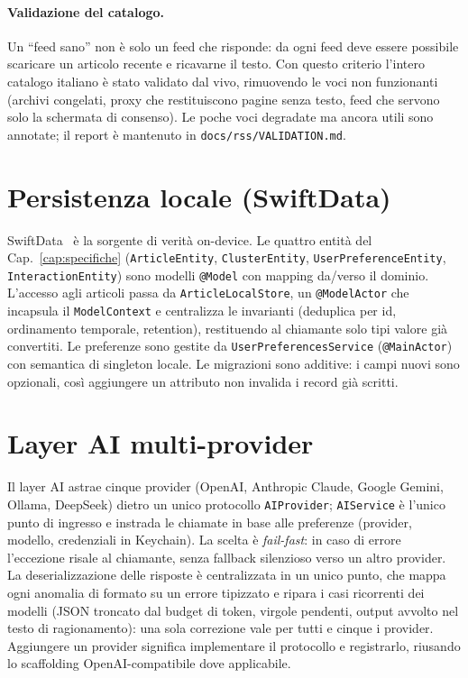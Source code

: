 \paragraph{Validazione del catalogo.}
\label{sec:catalog-validation}
Un ``feed sano'' non è solo un feed che risponde: da ogni feed deve
essere possibile scaricare un articolo recente e ricavarne il
testo. Con questo criterio l'intero catalogo italiano è stato validato
dal vivo, rimuovendo le voci non funzionanti (archivi congelati, proxy
che restituiscono pagine senza testo, feed che servono solo la schermata
di consenso). Le poche voci degradate ma ancora utili sono annotate; il
report è mantenuto in \texttt{docs/rss/VALIDATION.md}.

\section{Persistenza locale (SwiftData)}
SwiftData~\cite{apple-swiftdata} è la sorgente di verità on-device. Le
quattro entità del Cap.~\ref{cap:specifiche} (\texttt{ArticleEntity},
\texttt{ClusterEntity}, \texttt{UserPreferenceEntity},
\texttt{InteractionEntity}) sono modelli \texttt{@Model} con mapping
da/verso il dominio. L'accesso agli articoli passa da
\texttt{ArticleLocalStore}, un \texttt{@ModelActor} che incapsula il
\texttt{ModelContext} e centralizza le invarianti (deduplica per id,
ordinamento temporale, retention), restituendo al chiamante solo tipi
valore già convertiti. Le preferenze sono gestite da
\texttt{UserPreferencesService} (\texttt{@MainActor}) con semantica di
singleton locale. Le migrazioni sono additive: i campi nuovi sono
opzionali, così aggiungere un attributo non invalida i record già
scritti.

\section{Layer AI multi-provider}
Il layer AI astrae cinque provider (OpenAI, Anthropic Claude, Google
Gemini, Ollama, DeepSeek) dietro un unico protocollo
\texttt{AIProvider}; \texttt{AIService} è l'unico punto di ingresso e
instrada le chiamate in base alle preferenze (provider, modello,
credenziali in Keychain). La scelta è \emph{fail-fast}: in caso di
errore l'eccezione risale al chiamante, senza fallback silenzioso
verso un altro provider. La deserializzazione delle risposte è
centralizzata in un unico punto, che mappa ogni anomalia di formato su
un errore tipizzato e ripara i casi ricorrenti dei modelli (JSON
troncato dal budget di token, virgole pendenti, output avvolto nel testo
di ragionamento): una sola correzione vale per tutti e cinque i
provider. Aggiungere un provider significa implementare il protocollo e
registrarlo, riusando lo scaffolding OpenAI-compatibile dove applicabile.

